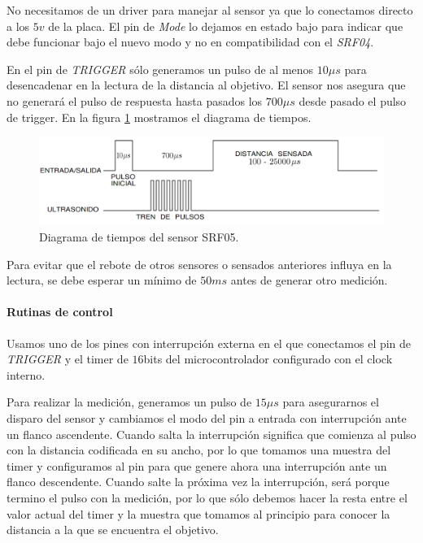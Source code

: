 No necesitamos de un driver para manejar al sensor ya que lo conectamos directo a los $5v$ de la placa.
El pin de \emph{Mode} lo dejamos en estado bajo para indicar que debe funcionar bajo el nuevo modo y no en compatibilidad con el \emph{SRF04}.

En el pin de \emph{TRIGGER} s\'olo generamos un pulso de al menos $10\mu s$ para desencadenar en la lectura de la distancia al objetivo.
El sensor nos asegura que no generar\'a el pulso de respuesta hasta pasados los $700\mu s$ desde pasado el pulso de trigger.
En la figura \ref{hF_srf05_pulse} mostramos el diagrama de tiempos.

\begin{figure}[ht]
	\centering
	\includegraphics[scale=0.25]{figuras/srf05_pulse.png}
	\caption{Diagrama de tiempos del sensor SRF05.}
	\label{hF_srf05_pulse}
\end{figure}

Para evitar que el rebote de otros sensores o sensados anteriores influya en la lectura, se debe esperar un m\'inimo de $50ms$ antes de
generar otro medici\'on.

\paragraph{Rutinas de control}
\label{h_sensado_ultrasonido_rutinas}

Usamos uno de los pines con interrupci\'on externa en el que conectamos el pin de \emph{TRIGGER} y el timer de $16$bits del microcontrolador
configurado con el clock interno.

Para realizar la medici\'on, generamos un pulso de $15\mu s$ para asegurarnos el disparo del sensor y cambiamos el modo del pin a entrada con
interrupci\'on ante un flanco ascendente.
Cuando salta la interrupci\'on significa que comienza al pulso con la distancia codificada en su ancho, por lo que tomamos una muestra del
timer y configuramos al pin para que genere ahora una interrupci\'on ante un flanco descendente.
Cuando salte la pr\'oxima vez la interrupci\'on, ser\'a porque termino el pulso con la medici\'on, por lo que s\'olo debemos hacer la resta
entre el valor actual del timer y la muestra que tomamos al principio para conocer la distancia a la que se encuentra el objetivo.

